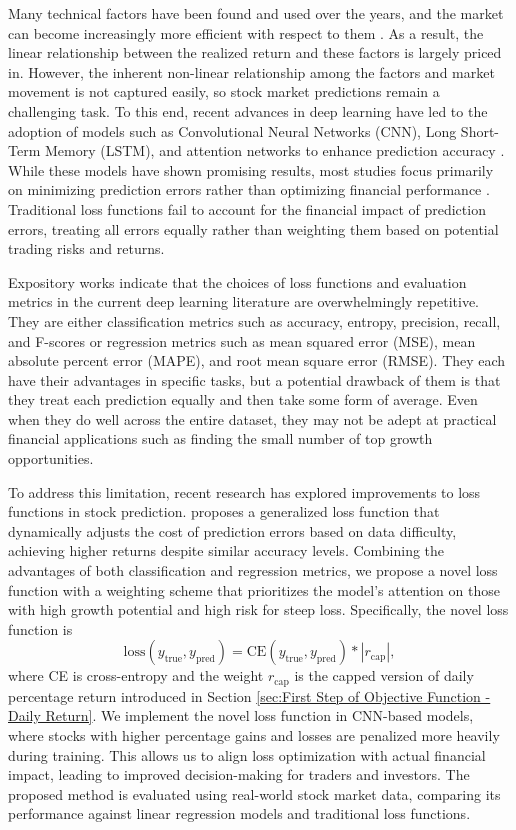\documentclass[preprint,12pt,numafflabel,authoryear]{elsarticle}
\begin{document}
Many technical factors have been found and used over the years, and the market can become increasingly more efficient with respect to them \citep{chen2021open}. As a result, the linear relationship between the realized return and these factors is largely priced in. However, the inherent non-linear relationship among the factors and market movement is not captured easily, so stock market predictions remain a challenging task. To this end, recent advances in deep learning have led to the adoption of models such as Convolutional Neural Networks (CNN), Long Short-Term Memory (LSTM), and attention networks to enhance prediction accuracy \citep{lu2020cnn, luo2024short, zhao2023stock}. While these models have shown promising results, most studies focus primarily on minimizing prediction errors rather than optimizing financial performance \citep{oncharoen2018deep}. Traditional loss functions fail to account for the financial impact of prediction errors, treating all errors equally rather than weighting them based on potential trading risks and returns.

Expository works \citep{ashtiani2023news, patel2023deep} indicate that the choices of loss functions and evaluation metrics in the current deep learning literature are overwhelmingly repetitive. They are either classification metrics such as accuracy, entropy, precision, recall, and F-scores or regression metrics such as mean squared error (MSE), mean absolute percent error (MAPE), and root mean square error (RMSE). They each have their advantages in specific tasks, but a potential drawback of them is that they treat each prediction equally and then take some form of average. Even when they do well across the entire dataset, they may not be adept at practical financial applications such as finding the small number of top growth opportunities.

To address this limitation, recent research has explored improvements to loss functions in stock prediction. \citet{zhao2024generalized} proposes a generalized loss function that dynamically adjusts the cost of prediction errors based on data difficulty, achieving higher returns despite similar accuracy levels. Combining the advantages of both classification and regression metrics, we propose a novel loss function with a weighting scheme that prioritizes the model's attention on those with high growth potential and high risk for steep loss. Specifically, the novel loss function is
\[
\mathrm{loss}(y_{\text{true}}, y_{\text{pred}}) = \mathrm{CE}(y_{\text{true}}, y_{\text{pred}}) * |r_{\text{cap}}|,
\]
where CE is cross-entropy and the weight $r_{\text{cap}}$ is the capped version of daily percentage return introduced in Section \ref{sec:First Step of Objective Function - Daily Return}. We implement the novel loss function in CNN-based models, where stocks with higher percentage gains and losses are penalized more heavily during training. This allows us to align loss optimization with actual financial impact, leading to improved decision-making for traders and investors. The proposed method is evaluated using real-world stock market data, comparing its performance against linear regression models and traditional loss functions.
\end{document}
